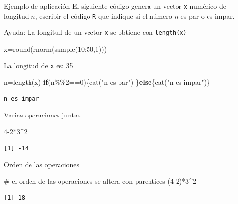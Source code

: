 \documentclass[
  ignorenonframetext,
  aspectratio=169,
  spanish,
]{beamer}
\newenvironment{Shaded}{\begin{snugshade}}{\end{snugshade}}
\newcommand{\CommentTok}[1]{\textcolor[rgb]{0.37,0.37,0.37}{#1}}
\newcommand{\ControlFlowTok}[1]{\textcolor[rgb]{0.00,0.23,0.31}{\textbf{#1}}}
\newcommand{\DecValTok}[1]{\textcolor[rgb]{0.68,0.00,0.00}{#1}}
\newcommand{\FunctionTok}[1]{\textcolor[rgb]{0.28,0.35,0.67}{#1}}
\newcommand{\NormalTok}[1]{\textcolor[rgb]{0.00,0.23,0.31}{#1}}
\newcommand{\OtherTok}[1]{\textcolor[rgb]{0.00,0.23,0.31}{#1}}
\newcommand{\SpecialCharTok}[1]{\textcolor[rgb]{0.37,0.37,0.37}{#1}}
\newcommand{\StringTok}[1]{\textcolor[rgb]{0.13,0.47,0.30}{#1}}
\begin{document}
\begin{frame}[fragile]{Ejemplo de aplicación}
\label{ejemplo-de-aplicaciuxf3n}
El siguiente código genera un vector \texttt{x} numérico de longitud
\(n\), escribir el código \texttt{R} que indique si el número \(n\) es
par o es impar.

Ayuda: La longitud de un vector \texttt{x} se obtiene con
\texttt{length(x)}

\begin{Shaded}
\begin{Highlighting}[]
\NormalTok{x}\OtherTok{=}\FunctionTok{round}\NormalTok{(}\FunctionTok{rnorm}\NormalTok{(}\FunctionTok{sample}\NormalTok{(}\DecValTok{10}\SpecialCharTok{:}\DecValTok{50}\NormalTok{,}\DecValTok{1}\NormalTok{)))}
\end{Highlighting}
\end{Shaded}

La longitud de \texttt{x} es: 35

\begin{Shaded}
\begin{Highlighting}[]
\NormalTok{n}\OtherTok{=}\FunctionTok{length}\NormalTok{(x)}
\ControlFlowTok{if}\NormalTok{(n}\SpecialCharTok{\%\%}\DecValTok{2}\SpecialCharTok{==}\DecValTok{0}\NormalTok{)\{}\FunctionTok{cat}\NormalTok{(}\StringTok{"n es par"}\NormalTok{)}
\NormalTok{  \}}\ControlFlowTok{else}\NormalTok{\{}\FunctionTok{cat}\NormalTok{(}\StringTok{"n es impar"}\NormalTok{)\}}
\end{Highlighting}
\end{Shaded}

\begin{verbatim}
n es impar
\end{verbatim}
\end{frame}

\begin{frame}[fragile]{Varias operaciones juntas}
\label{varias-operaciones-juntas}
\begin{Shaded}
\begin{Highlighting}[]
\DecValTok{4{-}2}\SpecialCharTok{*}\DecValTok{3}\SpecialCharTok{\^{}}\DecValTok{2} 
\end{Highlighting}
\end{Shaded}

\begin{verbatim}
[1] -14
\end{verbatim}
\end{frame}

\begin{frame}[fragile]{Orden de las operaciones}
\label{orden-de-las-operaciones}
\begin{Shaded}
\begin{Highlighting}[]
\CommentTok{\# el orden de las operaciones se altera con parentices  }
\NormalTok{(}\DecValTok{4{-}2}\NormalTok{)}\SpecialCharTok{*}\DecValTok{3}\SpecialCharTok{\^{}}\DecValTok{2}
\end{Highlighting}
\end{Shaded}

\begin{verbatim}
[1] 18
\end{verbatim}
\end{frame}
\end{document}
